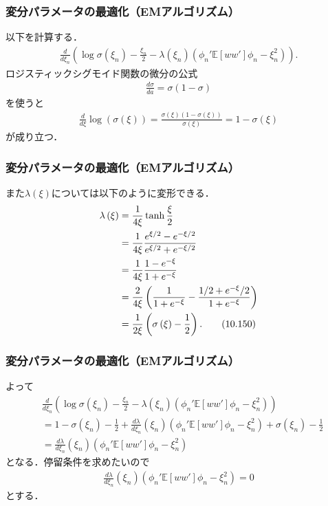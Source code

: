 \documentclass[10pt,usepdftitle=false,hyperref={unicode}]{beamer}
\newcommand{\parentheses}[1]{\left(#1\right)}
\newcommand{\brackets}[1]{\left[#1\right]}
\begin{document}
\begin{frame}
\frametitle{変分パラメータの最適化（EMアルゴリズム）}
以下を計算する．
\begin{align*}
    \frac{d}{d\xi_n}\parentheses{\log \sigma\parentheses{\xi_n} - \frac{\xi_n}{2} - \lambda\parentheses{\xi_n}
            \parentheses{\phi_n'\mathbb{E}\brackets{ww'}\phi_n - \xi_n^2}}.
\end{align*}
ロジスティックシグモイド関数の微分の公式
\begin{align}
    \frac{d\sigma}{da} = \sigma\parentheses{1 - \sigma} \tag{4.88}
\end{align}
を使うと
\begin{align*}
    \frac{d}{d\xi}\log \parentheses{\sigma\parentheses{\xi}}
    = \frac{\sigma\parentheses{\xi}\parentheses{1 - \sigma\parentheses{\xi}}}{\sigma\parentheses{\xi}}
    = 1 - \sigma\parentheses{\xi}
\end{align*}
が成り立つ．
\end{frame}

\begin{frame}
\frametitle{変分パラメータの最適化（EMアルゴリズム）}
また$\lambda\parentheses{\xi}$については以下のように変形できる．
\begin{align}
    \lambda\parentheses{\xi} &= \frac{1}{4\xi} \tanh \frac{\xi}{2} \notag \\
                             &= \frac{1}{4\xi} \frac{e^{\xi/2} - e^{-\xi/2}}{e^{\xi/2} + e^{-\xi/2}} \notag \\
                             &= \frac{1}{4\xi} \frac{1 - e^{-\xi}}{1 + e^{-\xi}} \notag \\
                             &= \frac{2}{4\xi} \parentheses{\frac{1}{1 + e^{-\xi}} - \frac{1/2 + e^{-\xi}/2}{1 + e^{-\xi}}} \notag \\
                             &= \frac{1}{2\xi} \parentheses{\sigma\parentheses{\xi} - \frac{1}{2}}. \tag{10.150}
\end{align}
\end{frame}

\begin{frame}
\frametitle{変分パラメータの最適化（EMアルゴリズム）}
よって
\begin{align*}
    &\frac{d}{d\xi_n}\parentheses{\log \sigma\parentheses{\xi_n} - \frac{\xi_n}{2} - \lambda\parentheses{\xi_n}
        \parentheses{\phi_n'\mathbb{E}\brackets{ww'}\phi_n - \xi_n^2}} \\
    &= 1 - \sigma\parentheses{\xi_n} - \frac{1}{2} + \frac{d\lambda}{d\xi_n}\parentheses{\xi_n}\parentheses{\phi_n'\mathbb{E}\brackets{ww'}\phi_n - \xi_n^2}
        + \sigma\parentheses{\xi_n} - \frac{1}{2} \\
    &= \frac{d\lambda}{d\xi_n}\parentheses{\xi_n}\parentheses{\phi_n'\mathbb{E}\brackets{ww'}\phi_n - \xi_n^2}
\end{align*}
となる．停留条件を求めたいので
\begin{align}
    \frac{d\lambda}{d\xi_n}\parentheses{\xi_n}\parentheses{\phi_n'\mathbb{E}\brackets{ww'}\phi_n - \xi_n^2} = 0 \tag{10.162}
\end{align}
とする．
\end{frame}
\end{document}
